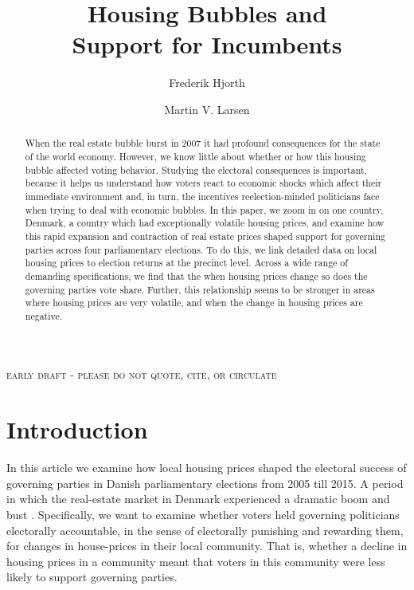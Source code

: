 \documentclass[12pt,a4paper]{article}
\title{\textbf{Housing Bubbles and \\Support for Incumbents}}
\author{
Frederik Hjorth \and Martin V. Larsen}
\begin{document}
\maketitle

\begin{center}
\textsc{early draft - please do not quote, cite, or circulate}
\end{center}

\begin{abstract}
\noindent When the real estate bubble burst in 2007 it had profound consequences for the state of the world economy. However, we know little about whether or how this housing bubble affected voting behavior. Studying the electoral consequences is important, because it helps us understand how voters react to economic shocks which affect their immediate environment and, in turn, the incentives reelection-minded politicians face when trying to deal with economic bubbles. In this paper, we zoom in on one country, Denmark, a country which had exceptionally volatile housing prices, and examine how this rapid expansion and contraction of real estate prices shaped support for governing parties across four parliamentary elections. To do this, we link detailed data on local housing prices to election returns at the precinct level. Across a wide range of demanding specifications, we find that the when housing prices change so does the governing parties vote share. Further, this relationship seems to be stronger in areas where housing prices are very volatile, and when the change in housing prices are negative.
 
\end{abstract}



\newpage

\doublespacing

\section{Introduction}
In this article we examine how local housing prices shaped the electoral success of governing parties in Danish parliamentary elections from 2005 till 2015. A period in which the real-estate market in Denmark experienced a dramatic boom and bust \citep{dam2011housing}. Specifically, we want to examine whether voters held governing politicians electorally accountable, in the sense of electorally punishing and rewarding them, for changes in house-prices in their local community. That is, whether a decline in housing prices in a community meant that voters in this community were less likely to support governing parties. 
\end{document}
